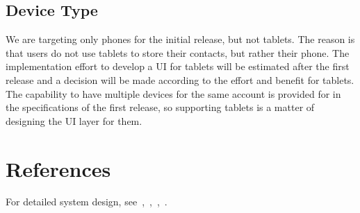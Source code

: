 \documentclass[a4paper, 10pt]{article}
\begin{document}
\subsection{Device Type}
We are targeting only phones for the initial release, but not tablets. The reason is that users do not use tablets to store their contacts, but rather their phone. The 
implementation effort to develop a UI for tablets will be estimated after the first release and a decision will be made according to the effort and benefit for tablets. The 
capability to have multiple devices for the same account is provided for in the specifications of the first release, so supporting tablets is a matter of designing the UI layer 
for them.

\section{References}
For detailed system design, see~\cite{data_structure_spec},~\cite{flow_spec},~\cite{UI_spec},~\cite{crypto_spec}.



\end{document}
